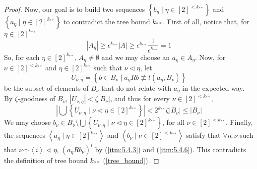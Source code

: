 \begin{proof}
            Now, our goal is to build two sequences $\left\{ b_\eta \mid \eta \in [2]^{<k_{**}} \right\}$ and
            $\left\{ a_\eta \mid \eta \in [2]^{k_{**}} \right\}$ to contradict the tree bound $k_{**}$.
            First of all, notice that, for $\eta \in [2]^{k_{**}}$
            \[
                |A_\eta| \geq \epsilon^{k_{**}} |A| \geq
                \epsilon^{k_{**}} \frac{1}{\epsilon^{k_{**}}} = 1
            \]
            So, for each $\eta \in [2]^{k_{**}}$, $A_\eta \neq \emptyset$ and we may choose an $a_\eta \in A_\eta$.
            Now, for $\nu \in [2]^{<k_{**}}$ and $\eta \in [2]^{k_{**}}$ such that $\nu \triangleleft \eta$, let
            \[
                U_{\nu,\eta} = \left\{ b \in B_\nu \mid a_\eta R b \not\equiv t(a_\eta, B_\nu) \right\}
            \]
            be the subset of elements of $B_\nu$ that do not relate with $a_\eta$ in the expected way.
            By $\zeta$-goodness of $B_\nu$, $|U_{\nu, \eta}| < \zeta |B_\nu|$, and thus for every $\nu \in [2]^{<k_{**}}$,
            \[
                \left|\bigcup\left\{ U_{\nu,\eta} \mid \nu \triangleleft \eta \in [2]^{k_{**}} \right\}\right| <
                2^{k_{**}} \zeta |B_\nu| \leq |B_\nu|
            \]
            We may choose $b_\nu \in B_\nu \setminus \bigcup\left\{ U_{\nu,\eta} \mid \nu \triangleleft \eta \in [2]^{k_{**}} \right\}$,
            for all $\nu \in [2]^{<k_{**}}$.
            Finally, the sequences $\left< a_\eta \mid \eta \in [2]^{k_{**}} \right>$ and $\left< b_\nu \mid \nu \in [2]^{<k_{**}} \right>$
            satisfy that $\forall \eta, \nu$ such that $\nu \frown \left< i \right> \triangleleft \eta$, $\left( a_\eta R b_\nu \right)^i$
            by (\ref{itm:5.4.3}) and (\ref{itm:5.4.6}).
            This contradicts the definition of tree bound $k_{**}$ (\ref{tree_bound}).
        \end{proof}

